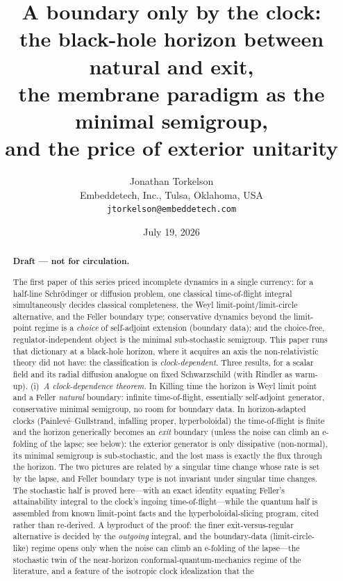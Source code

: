 \documentclass[11pt]{article}
\title{A boundary only by the clock:\\
the black-hole horizon between natural and exit,\\
the membrane paradigm as the minimal semigroup,\\
and the price of exterior unitarity}
\author{Jonathan Torkelson\\[2pt]
\small Embeddetech, Inc., Tulsa, Oklahoma, USA\\
\small\texttt{jtorkelson@embeddetech.com}}
\date{July 19, 2026}
\theoremstyle{definition}
\theoremstyle{remark}
\begin{document}
\maketitle

\begin{abstract}
\noindent\textbf{Draft --- not for circulation.}\medskip

\noindent
The first paper of this series priced incomplete dynamics in a single
currency: for a half-line Schr\"odinger or diffusion problem, one
classical time-of-flight integral simultaneously decides classical
completeness, the Weyl limit-point/limit-circle alternative, and the
Feller boundary type; conservative dynamics beyond the limit-point
regime is a \emph{choice} of self-adjoint extension (boundary data);
and the choice-free, regulator-independent object is the minimal
sub-stochastic semigroup. This paper runs that dictionary at a
black-hole horizon, where it acquires an axis the non-relativistic
theory did not have: the classification is \emph{clock-dependent}.
Three results, for a scalar field and its radial diffusion analogue on
fixed Schwarzschild (with Rindler as warm-up). (i)~\emph{A
clock-dependence theorem.} In Killing time the horizon is Weyl limit
point and a Feller \emph{natural} boundary: infinite time-of-flight,
essentially self-adjoint generator, conservative minimal semigroup, no
room for boundary data. In horizon-adapted clocks
(Painlev\'e--Gullstrand, infalling proper, hyperboloidal) the time-of-flight is
finite and the horizon generically becomes an \emph{exit} boundary
(unless the noise can climb an e-folding of the lapse; see below): the
exterior generator is only dissipative (non-normal), its minimal semigroup is
sub-stochastic, and the lost mass is exactly the flux through the
horizon. The two pictures are related by a singular time change whose
rate is set by the lapse, and Feller boundary type is not invariant
under singular time changes. The stochastic half is proved here---with
an exact identity equating Feller's attainability integral to the
clock's ingoing time-of-flight---while the quantum half is assembled
from known limit-point facts and the hyperboloidal-slicing program,
cited rather than re-derived. A byproduct of the proof: the finer
exit-versus-regular alternative is decided by the \emph{outgoing}
integral, and the boundary-data (limit-circle-like) regime opens only
when the noise can climb an e-folding of the lapse---the stochastic
twin of the near-horizon conformal-quantum-mechanics regime of the
literature, and a feature of the isotropic clock idealization that the

\end{abstract}
\end{document}
